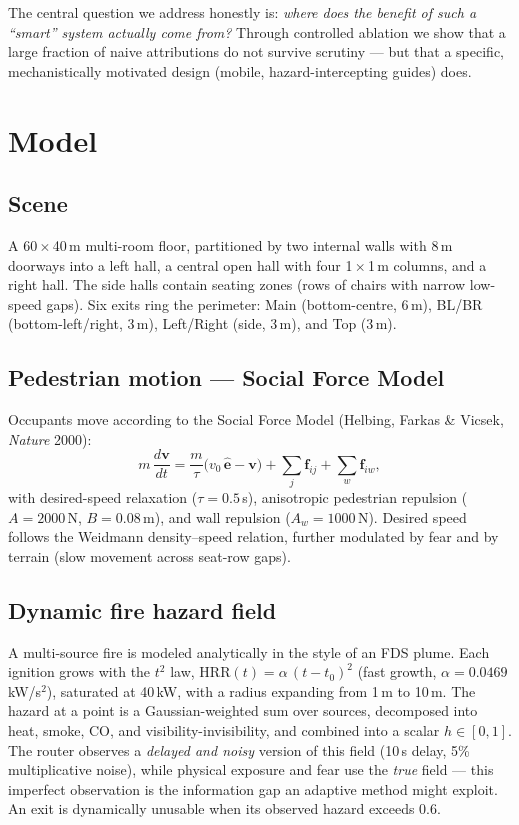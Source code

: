 \documentclass[11pt,a4paper]{article}
\begin{document}
The central question we address honestly is: \emph{where does the benefit of such a ``smart''
system actually come from?} Through controlled ablation we show that a large fraction of naive
attributions do not survive scrutiny --- but that a specific, mechanistically motivated design
(mobile, hazard-intercepting guides) does.

\section{Model}

\subsection{Scene}
A 60\,$\times$\,40\,m multi-room floor, partitioned by two internal walls with 8\,m doorways into
a left hall, a central open hall with four 1\,$\times$\,1\,m columns, and a right hall. The side
halls contain seating zones (rows of chairs with narrow low-speed gaps). Six exits ring the
perimeter: Main (bottom-centre, 6\,m), BL/BR (bottom-left/right, 3\,m), Left/Right (side, 3\,m),
and Top (3\,m).

\subsection{Pedestrian motion --- Social Force Model}
Occupants move according to the Social Force Model (Helbing, Farkas \& Vicsek, \emph{Nature} 2000):
\begin{equation}
m\,\frac{d\mathbf{v}}{dt} = \frac{m}{\tau}\bigl(v_0\,\hat{\mathbf{e}} - \mathbf{v}\bigr)
+ \sum_{j} \mathbf{f}_{ij} + \sum_{w} \mathbf{f}_{iw},
\end{equation}
with desired-speed relaxation ($\tau=0.5$\,s), anisotropic pedestrian repulsion
($A=2000$\,N, $B=0.08$\,m), and wall repulsion ($A_w=1000$\,N). Desired speed follows the
Weidmann density--speed relation, further modulated by fear and by terrain (slow movement across
seat-row gaps).

\subsection{Dynamic fire hazard field}
A multi-source fire is modeled analytically in the style of an FDS plume. Each ignition grows
with the $t^2$ law, $\mathrm{HRR}(t)=\alpha\,(t-t_0)^2$ (fast growth, $\alpha=0.0469$\,kW/s$^2$),
saturated at 40\,kW, with a radius expanding from 1\,m to 10\,m. The hazard at a point is a
Gaussian-weighted sum over sources, decomposed into heat, smoke, CO, and visibility-invisibility,
and combined into a scalar $h\in[0,1]$. The router observes a \emph{delayed and noisy} version of
this field (10\,s delay, 5\% multiplicative noise), while physical exposure and fear use the
\emph{true} field --- this imperfect observation is the information gap an adaptive method might
exploit. An exit is dynamically unusable when its observed hazard exceeds 0.6.
\end{document}
